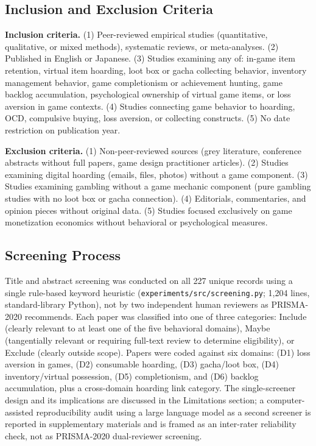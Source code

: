 \documentclass[12pt]{article}
\begin{document}
\subsection{Inclusion and Exclusion Criteria}

\textbf{Inclusion criteria.} (1) Peer-reviewed empirical studies (quantitative, qualitative, or mixed methods), systematic reviews, or meta-analyses. (2) Published in English or Japanese. (3) Studies examining any of: in-game item retention, virtual item hoarding, loot box or gacha collecting behavior, inventory management behavior, game completionism or achievement hunting, game backlog accumulation, psychological ownership of virtual game items, or loss aversion in game contexts. (4) Studies connecting game behavior to hoarding, OCD, compulsive buying, loss aversion, or collecting constructs. (5) No date restriction on publication year.

\textbf{Exclusion criteria.} (1) Non-peer-reviewed sources (grey literature, conference abstracts without full papers, game design practitioner articles). (2) Studies examining digital hoarding (emails, files, photos) without a game component. (3) Studies examining gambling without a game mechanic component (pure gambling studies with no loot box or gacha connection). (4) Editorials, commentaries, and opinion pieces without original data. (5) Studies focused exclusively on game monetization economics without behavioral or psychological measures.

\subsection{Screening Process}

Title and abstract screening was conducted on all 227 unique records using a single rule-based keyword heuristic (\texttt{experiments/src/screening.py}; 1{,}204 lines, standard-library Python), not by two independent human reviewers as PRISMA-2020 recommends. Each paper was classified into one of three categories: Include (clearly relevant to at least one of the five behavioral domains), Maybe (tangentially relevant or requiring full-text review to determine eligibility), or Exclude (clearly outside scope). Papers were coded against six domains: (D1) loss aversion in games, (D2) consumable hoarding, (D3) gacha/loot box, (D4) inventory/virtual possession, (D5) completionism, and (D6) backlog accumulation, plus a cross-domain hoarding link category. The single-screener design and its implications are discussed in the Limitations section; a computer-assisted reproducibility audit using a large language model as a second screener is reported in supplementary materials and is framed as an inter-rater reliability check, not as PRISMA-2020 dual-reviewer screening.
\end{document}
